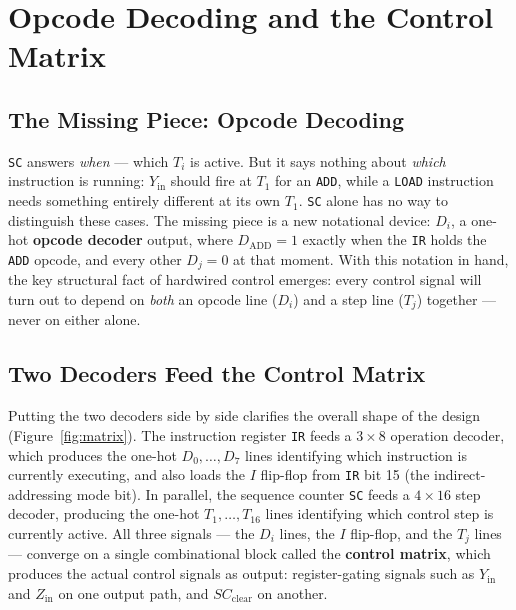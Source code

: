 \documentclass[11pt]{article}
\begin{document}
\section{Opcode Decoding and the Control Matrix}
\label{sec:opcode}

\subsection{The Missing Piece: Opcode Decoding}

\texttt{SC} answers \emph{when} --- which $T_i$ is active. But it says nothing about \emph{which} instruction is running: $Y_{\text{in}}$ should fire at $T_1$ for an \texttt{ADD}, while a \texttt{LOAD} instruction needs something entirely different at its own $T_1$. \texttt{SC} alone has no way to distinguish these cases. The missing piece is a new notational device: $D_i$, a one-hot \textbf{opcode decoder} output, where $D_{\text{ADD}} = 1$ exactly when the \texttt{IR} holds the \texttt{ADD} opcode, and every other $D_j = 0$ at that moment. With this notation in hand, the key structural fact of hardwired control emerges: every control signal will turn out to depend on \emph{both} an opcode line ($D_i$) and a step line ($T_j$) together --- never on either alone.

\subsection{Two Decoders Feed the Control Matrix}

Putting the two decoders side by side clarifies the overall shape of the design (Figure~\ref{fig:matrix}). The instruction register \texttt{IR} feeds a $3{\times}8$ operation decoder, which produces the one-hot $D_0, \dots, D_7$ lines identifying which instruction is currently executing, and also loads the $I$ flip-flop from \texttt{IR} bit 15 (the indirect-addressing mode bit). In parallel, the sequence counter \texttt{SC} feeds a $4{\times}16$ step decoder, producing the one-hot $T_1, \dots, T_{16}$ lines identifying which control step is currently active. All three signals --- the $D_i$ lines, the $I$ flip-flop, and the $T_j$ lines --- converge on a single combinational block called the \textbf{control matrix}, which produces the actual control signals as output: register-gating signals such as $Y_{\text{in}}$ and $Z_{\text{in}}$ on one output path, and $SC_{\text{clear}}$ on another.
\end{document}
